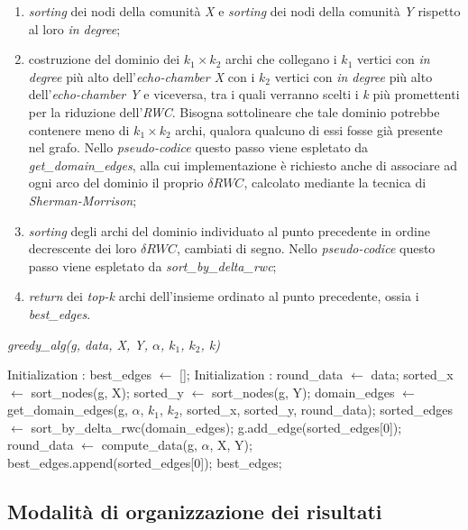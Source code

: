 \begin{enumerate}
\item \textit{sorting} dei nodi della comunità \textit{X} e \textit{sorting} dei nodi della comunità \textit{Y} rispetto al loro \textit{in degree};
\item costruzione del dominio dei \textit{$k_1 \times k_2$} archi che collegano i \textit{$k_1$} vertici con \textit{in degree} più alto dell'\textit{echo-chamber X} con i \textit{$k_2$} vertici con \textit{in degree} più alto dell'\textit{echo-chamber Y} e viceversa, tra i quali verranno scelti i \textit{k} più promettenti per la riduzione dell'\textit{RWC}. Bisogna sottolineare che tale dominio potrebbe contenere meno di  \textit{$k_1 \times k_2$} archi, qualora qualcuno di essi fosse già presente nel grafo. Nello \textit{pseudo-codice} questo passo viene espletato da \textit{get\_domain\_edges}, alla cui implementazione è richiesto anche di associare ad ogni arco del dominio il proprio \textit{$\delta RWC$}, calcolato mediante la tecnica di \textit{Sherman-Morrison};
\item \textit{sorting} degli archi del dominio individuato al punto precedente in ordine decrescente dei loro \textit{$\delta RWC$}, cambiati di segno. Nello \textit{pseudo-codice} questo passo viene espletato da \textit{sort\_by\_delta\_rwc};
\item \textit{return} dei \textit{top-k} archi dell'insieme ordinato al punto precedente, ossia i \textit{best\_edges}.
\end{enumerate}

\begin{algorithm}
\caption{\textit{greedy\_alg(g, data, X, Y, $\alpha$, $k_1$, $k_2$, k)}}
\begin{algorithmic} 
\STATE Initialization : best\_edges $\leftarrow$ [];
\STATE Initialization : round\_data $\leftarrow$ data;
\STATE sorted\_x $\leftarrow$ sort\_nodes(g, X); 
\STATE sorted\_y $\leftarrow$ sort\_nodes(g, Y);
\STATE domain\_edges $\leftarrow$ get\_domain\_edges(g, $\alpha$, $k_1$, $k_2$, sorted\_x, sorted\_y, round\_data);
\STATE sorted\_edges $\leftarrow$ sort\_by\_delta\_rwc(domain\_edges);
\STATE g.add\_edge(sorted\_edges[0]);
\STATE round\_data $\leftarrow$ compute\_data(g, $\alpha$, X, Y);
\STATE best\_edges.append(sorted\_edges[0]);
\ENDFOR
\RETURN best\_edges;
\end{algorithmic}
\end{algorithm}



\subsection{Modalità di organizzazione dei risultati}





